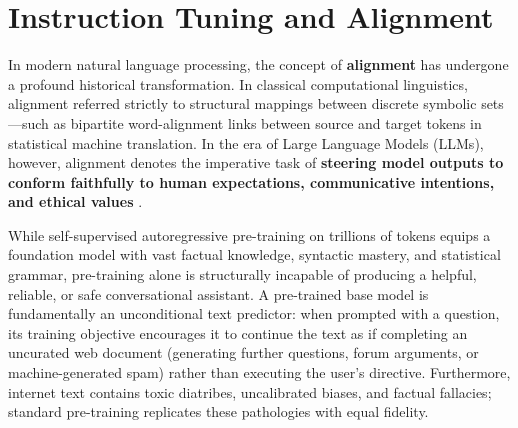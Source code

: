 \documentclass[../../../main.tex]{subfiles}
\begin{document}
\chapter{Instruction Tuning and Alignment}
\label{ch:instruction_tuning_alignment}

In modern natural language processing, the concept of \textbf{alignment} has undergone a profound historical transformation. In classical computational linguistics, alignment referred strictly to structural mappings between discrete symbolic sets---such as bipartite word-alignment links between source and target tokens in statistical machine translation. In the era of Large Language Models (LLMs), however, alignment denotes the imperative task of \textbf{steering model outputs to conform faithfully to human expectations, communicative intentions, and ethical values} \citep{xiao2025}.

While self-supervised autoregressive pre-training on trillions of tokens equips a foundation model with vast factual knowledge, syntactic mastery, and statistical grammar, pre-training alone is structurally incapable of producing a helpful, reliable, or safe conversational assistant. A pre-trained base model is fundamentally an unconditional text predictor: when prompted with a question, its training objective encourages it to continue the text as if completing an uncurated web document (generating further questions, forum arguments, or machine-generated spam) rather than executing the user's directive. Furthermore, internet text contains toxic diatribes, uncalibrated biases, and factual fallacies; standard pre-training replicates these pathologies with equal fidelity.
\end{document}
